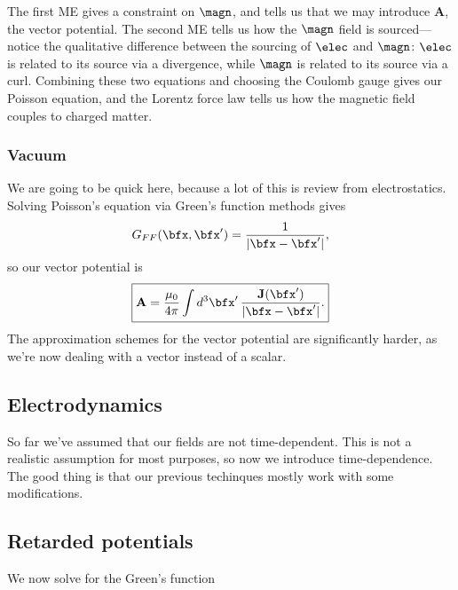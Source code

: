 \documentclass[11pt]{article}
\begin{document}
The first ME gives a constraint on $\magn$, and tells us that
we may introduce $\mathbf{A}$, the vector potential. The second
ME tells us how the $\magn$ field is sourced---notice the qualitative
difference between the sourcing of $\elec$ and $\magn$: $\elec$
is related to its source via a divergence, while $\magn$ is related
to its source via a curl. Combining these two equations and choosing 
the Coulomb gauge gives our Poisson equation, and the Lorentz force 
law tells us how the magnetic field couples to charged matter.

\subsubsection{Vacuum}

We are going to be quick here, because a lot of this is review from
electrostatics. Solving Poisson's equation via Green's function
methods gives
\begin{align*}
    G_{FF}(\bfx, \bfx') = \frac{1}{|\bfx - \bfx'|}, 
\end{align*}
so our vector potential is
\begin{align*}
    \boxed{\mathbf{A} = \frac{\mu_0}{4\pi} \int d^3 \bfx' \, \frac{\mathbf{J}(\bfx')}{|\bfx - \bfx'|}.}
\end{align*}
The approximation schemes for the vector potential are significantly
harder, as we're now dealing with a vector instead of a scalar.




\subsection{Electrodynamics}

So far we've assumed that our fields are not time-dependent.
This is not a realistic assumption for most purposes, so now
we introduce time-dependence. The good thing is that our previous 
techinques mostly work with some modifications.

\subsection{Retarded potentials}

We now solve for the Green's function 
\end{document}
